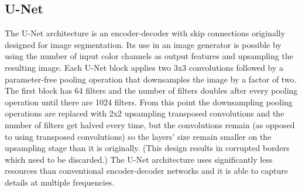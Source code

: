 \subsection{U-Net}
The U-Net architecture is an encoder-decoder with skip connections originally designed for image segmentation. Its use in an image generator is possible by using the number of input color channels as output features and upsampling the resulting image. Each U-Net block applies two 3x3 convolutions followed by a parameter-free pooling operation that downsamples the image by a factor of two. The first block has 64 filters and the number of filters doubles after every pooling operation until there are 1024 filters. From this point the downsampling pooling operations are replaced with 2x2 upsampling transposed convolutions and the number of filters get halved every time, but the convolutions remain (as opposed to using transposed convolutions) so the layers' size remain smaller on the upsampling stage than it is originally. (This design results in corrupted borders which need to be discarded.) The U-Net architecture uses significantly less resources than conventional encoder-decoder networks and it is able to capture details at multiple frequencies.
